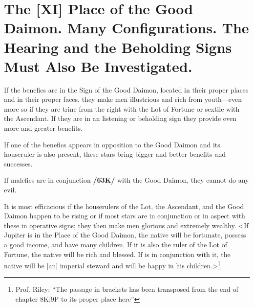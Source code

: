 \section{The [XI] Place of the Good Daimon. Many Configurations. The Hearing and the Beholding Signs Must Also Be Investigated.}
If the benefics are in the Sign of the Good Daimon, located in their proper places and in their proper faces, they make men illustrious and rich from youth—even more so if they are trine from the right with the Lot of Fortune or sextile with the Ascendant. If they are in an listening or beholding sign they provide even more and greater benefits. 

If one of the benefics appears in opposition to the Good Daimon and its houseruler is also present, these stars bring bigger and better benefits and successes. 

If malefics are in conjunction \textbf{/63K/} with the Good Daimon, they cannot do any evil. 

It is most efficacious if the houserulers of the Lot, the Ascendant, and the Good Daimon happen to be rising or if most stars are in conjunction or in aspect with these in operative signs; they then make men glorious and extremely wealthy. 
<If Jupiter is in the Place of the Good Daimon, the native will be fortunate, possess a good income, and have many
children. If it is also the ruler of the Lot of Fortune, the native will be rich and blessed. If \Mercury\xspace is in conjunction with it, the native will be [an] imperial steward and will be happy in his children.>\footnote{Prof. Riley: ``The passage in brackets has been transposed from the end of chapter 8K;9P to its proper place here''}

\newpage